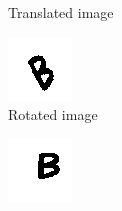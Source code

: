 \documentclass{article}
\begin{document}
\begin{figure}
\begin{subfigure}{0.11\textwidth}
  \caption{Translated image}
\end{subfigure}
\begin{subfigure}{0.11\textwidth}
  \centering
  \includegraphics[width=\linewidth]{images/rotated}
  \caption{Rotated image}
\end{subfigure}
\begin{subfigure}{0.11\textwidth}
  \centering
  \includegraphics[width=\linewidth]{images/scaled}

\end{subfigure}
\end{figure}
\end{document}

